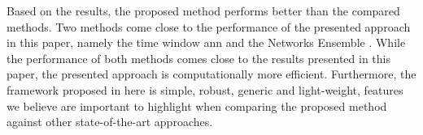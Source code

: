 Based on the results, the proposed method performs better than the compared methods. Two methods come close to the performance of the presented approach in this paper, namely the time window \gls{ann} \citep{Lim2016} and the Networks Ensemble \citep{Zhang2016}. While the performance of both methods comes close to the results presented in this paper, the presented approach is computationally more efficient. Furthermore, the framework proposed in here is simple, robust, generic and light-weight, features we believe are important to highlight when comparing the proposed method against other state-of-the-art approaches.

